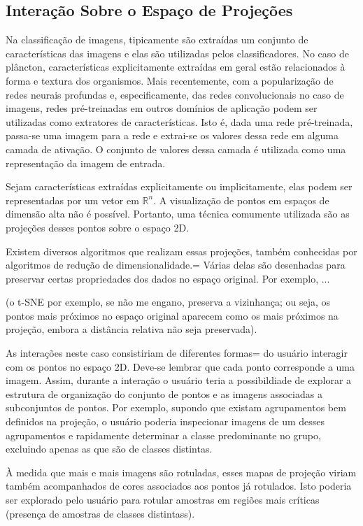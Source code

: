 \subsection{Interação Sobre o Espaço de Projeções}
\label{sec:espaco_projecoes}

Na classificação de imagens, tipicamente são extraídas um conjunto de características das imagens e elas são utilizadas pelos classificadores. No caso de plâncton, características explicitamente extraídas em geral estão relacionados à forma e textura dos organismos. Mais recentemente, com a popularização de redes neurais profundas e, especificamente, das redes convolucionais no caso de imagens, redes pré-treinadas em outros domínios de aplicação podem ser utilizadas como extratores de características. Isto é, dada uma rede pré-treinada, passa-se uma imagem para a rede e extrai-se os valores dessa rede em alguma camada de ativação. O conjunto de valores dessa camada é utilizada como uma representação da imagem de entrada.

Sejam características extraídas explicitamente ou implicitamente, elas podem ser representadas por um vetor em $\mathbb{R}^n$. A visualização de pontos em espaços de dimensão alta não é possível. Portanto, uma técnica comumente utilizada são as projeções desses pontos sobre o espaço 2D.

Existem diversos algoritmos que realizam essas projeções, também conhecidas por algoritmos de redução de dimensionalidade.= Várias delas são desenhadas para preservar certas propriedades dos dados no espaço original. Por exemplo, ...

(o t-SNE por exemplo, se não me engano, preserva a vizinhança; ou seja, os pontos mais próximos no espaço original aparecem como os mais próximos na projeção, embora a distância relativa não seja preservada).

As interações neste caso consistiriam de diferentes formas= do usuário interagir com os pontos no espaço 2D. Deve-se lembrar que cada ponto corresponde a uma imagem. Assim, durante a interação o usuário teria a possibildiade de explorar a estrutura de organização do conjunto de pontos e as imagens associadas a subconjuntos de pontos. Por exemplo, supondo que existam agrupamentos bem definidos na projeção, o usuário poderia inspecionar imagens de um desses agrupamentos e rapidamente determinar a classe predominante no grupo, excluindo apenas as que são de classes distintas.

À medida que mais e mais imagens são rotuladas, esses mapas de projeção viriam também acompanhados de cores associados aos pontos já rotulados. Isto poderia ser explorado pelo usuário para rotular amostras em regiões mais críticas (presença de amostras de classes distintass).





